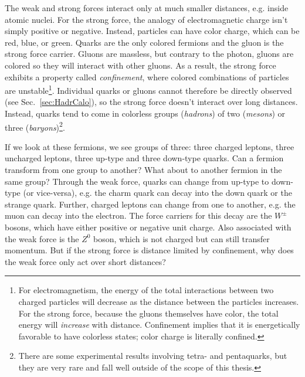 The weak and strong forces interact only at much smaller distances, e.g. inside atomic nuclei. For the strong force, the analogy of electromagnetic charge isn't simply positive or negative. Instead, particles can have color charge, which can be red, blue, or green. Quarks are the only colored fermions and the gluon is the strong force carrier. Gluons are massless, but contrary to the photon, gluons are colored so they will interact with other gluons. As a result, the strong force exhibits a property called \textit{confinement}, where colored combinations of particles are unstable\footnote{For electromagnetism, the energy of the total interactions between two charged particles will decrease as the distance between the particles increases. For the strong force, because the gluons themselves have color, the total energy will \textit{increase} with distance. Confinement implies that it is energetically favorable to have colorless states; color charge is literally confined.}. Individual quarks or gluons cannot therefore be directly observed (see Sec.~\ref{sec:HadrCalo}), so the strong force doesn't interact over long distances. Instead, quarks tend to come in colorless groups (\textit{hadrons}) of two (\textit{mesons}) or three (\textit{baryons})\footnote{There are some experimental results involving tetra- and pentaquarks, but they are very rare and fall well outside of the scope of this thesis.}.

If we look at these fermions, we see groups of three: three charged leptons, three uncharged leptons, three up-type and three down-type quarks. Can a fermion transform from one group to another? What about to another fermion in the same group? Through the weak force, quarks can change from up-type to down-type (or vice-versa), e.g. the charm quark can decay into the down quark or the strange quark. Further, charged leptons can change from one to another, e.g. the muon can decay into the electron. The force carriers for this decay are the $W^{\pm}$ bosons, which have either positive or negative unit charge. Also associated with the weak force is the $Z^{0}$ boson, which is not charged but can still transfer momentum. But if the strong force is distance limited by confinement, why does the weak force only act over short distances? 

